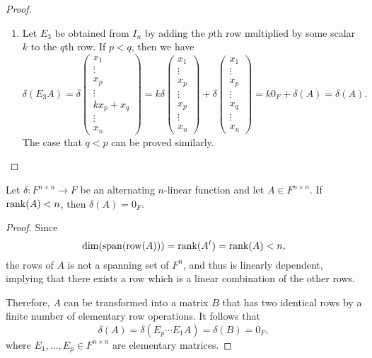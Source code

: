 \begin{proof}
\begin{enumerate}
    \item Let $E_3$ be obtained from $I_n$ by adding the $p$th row multiplied
    by some scalar $k$ to the $q$th row.
    If $p < q$, then we have
    \begin{equation*}
      \delta(E_3A)
      =
      \delta
      \begin{pmatrix}
        x_1 \\ \vdots \\ x_p \\ \vdots \\ kx_p + x_q \\ \vdots \\ x_n
      \end{pmatrix}
      =
      k\delta
      \begin{pmatrix}
        x_1 \\ \vdots \\ x_p \\ \vdots \\ x_p \\ \vdots \\ x_n
      \end{pmatrix}
      +
      \delta
      \begin{pmatrix}
        x_1 \\ \vdots \\ x_p \\ \vdots \\ x_q \\ \vdots \\ x_n
      \end{pmatrix}
      = k0_F + \delta(A)
      = \delta(A).
    \end{equation*}
    The case that $q < p$ can be proved similarly.
    \qedhere
  \end{enumerate}
\end{proof}

\begin{theorem}
  Let $\delta: F^{n \times n} \to F$ be an alternating $n$-linear function
  and let $A \in F^{n \times n}$.
  If $\operatorname{rank}(A) < n$, then $\delta(A) = 0_F$.
\end{theorem}
\begin{proof}
  Since
  \begin{equation*}
    \dim(\operatorname{span}(\operatorname{row}(A))) = \operatorname{rank}(A^t) = \operatorname{rank}(A) < n,
  \end{equation*}
  the rows of $A$ is not a spanning set of $F^n$, and thus is linearly
  dependent, implying that there exists a row which is a linear combination of
  the other rows.

  Therefore, $A$ can be transformed into a matrix $B$ that has two identical
  rows by a finite number of elementary row operations.
  It follows that
  \begin{equation*}
    \delta(A) = \delta(E_p \cdots E_1A) = \delta(B) = 0_F,
  \end{equation*}
  where $E_1, \dots, E_p \in F^{n \times n}$ are elementary matrices.
\end{proof}

